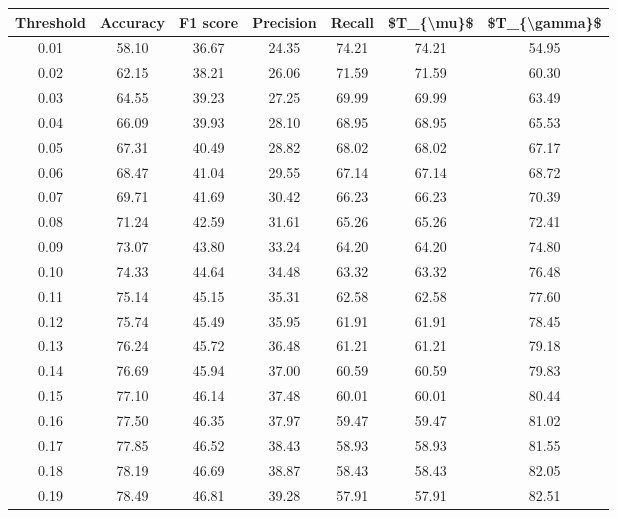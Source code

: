 \begin{tabular}{|c|c|c|c|c|c|c|}
\hline
 Threshold &  Accuracy &  F1 score &  Precision &  Recall &  \$T\_\{\textbackslash mu\}\$ &  \$T\_\{\textbackslash gamma\}\$ \\
\hline
      0.01 &     58.10 &     36.67 &      24.35 &   74.21 &      74.21 &         54.95 \\
      0.02 &     62.15 &     38.21 &      26.06 &   71.59 &      71.59 &         60.30 \\
      0.03 &     64.55 &     39.23 &      27.25 &   69.99 &      69.99 &         63.49 \\
      0.04 &     66.09 &     39.93 &      28.10 &   68.95 &      68.95 &         65.53 \\
      0.05 &     67.31 &     40.49 &      28.82 &   68.02 &      68.02 &         67.17 \\
      0.06 &     68.47 &     41.04 &      29.55 &   67.14 &      67.14 &         68.72 \\
      0.07 &     69.71 &     41.69 &      30.42 &   66.23 &      66.23 &         70.39 \\
      0.08 &     71.24 &     42.59 &      31.61 &   65.26 &      65.26 &         72.41 \\
      0.09 &     73.07 &     43.80 &      33.24 &   64.20 &      64.20 &         74.80 \\
      0.10 &     74.33 &     44.64 &      34.48 &   63.32 &      63.32 &         76.48 \\
      0.11 &     75.14 &     45.15 &      35.31 &   62.58 &      62.58 &         77.60 \\
      0.12 &     75.74 &     45.49 &      35.95 &   61.91 &      61.91 &         78.45 \\
      0.13 &     76.24 &     45.72 &      36.48 &   61.21 &      61.21 &         79.18 \\
      0.14 &     76.69 &     45.94 &      37.00 &   60.59 &      60.59 &         79.83 \\
      0.15 &     77.10 &     46.14 &      37.48 &   60.01 &      60.01 &         80.44 \\
      0.16 &     77.50 &     46.35 &      37.97 &   59.47 &      59.47 &         81.02 \\
      0.17 &     77.85 &     46.52 &      38.43 &   58.93 &      58.93 &         81.55 \\
      0.18 &     78.19 &     46.69 &      38.87 &   58.43 &      58.43 &         82.05 \\
      0.19 &     78.49 &     46.81 &      39.28 &   57.91 &      57.91 &         82.51 \\

\end{tabular}
